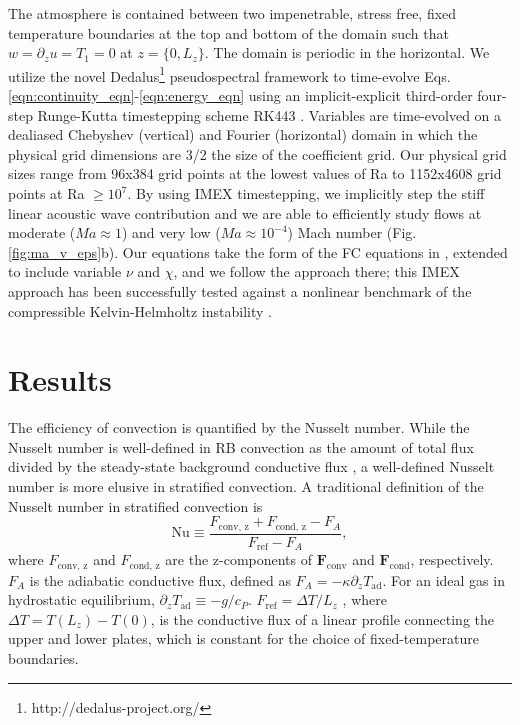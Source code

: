 \documentclass[aps, prl, twocolumn, nofootinbib, groupedaddress, amsfonts, amssymb, amsmath]{revtex4-1}
\begin{document}
The atmosphere is contained between two impenetrable, stress free, fixed temperature boundaries at
the top and bottom of the domain such that $w = \partial_z u = T_1 = 0$ at $z = \{0, L_z\}$. The domain
is periodic in the horizontal. We utilize the novel Dedalus\footnote{http://dedalus-project.org/} pseudospectral framework 
 to time-evolve Eqs. 
\ref{eqn:continuity_eqn}-\ref{eqn:energy_eqn} using an implicit-explicit third-order four-step 
Runge-Kutta timestepping scheme RK443 \cite{ascher&all1997}.  
Variables are time-evolved on a dealiased Chebyshev (vertical)
and Fourier (horizontal) domain in which the
physical grid dimensions are 3/2 the size of the coefficient grid.  Our physical grid sizes range from
96x384 grid points at the lowest values of Ra to 1152x4608 grid points at Ra $\geq 10^{7}$. 
By using IMEX timestepping, we implicitly step the stiff linear acoustic wave contribution and we are able to
efficiently study flows at moderate ($Ma \approx 1$) and very low ($Ma \approx 10^{-4}$)
Mach number (Fig. \ref{fig:ma_v_eps}b).  Our equations take the form
of the FC equations in \cite{lecoanet&all2014}, extended to include variable
$\nu$ and $\chi$, and we follow the approach there; this IMEX approach has been successfully 
tested against a nonlinear benchmark  of the compressible Kelvin-Helmholtz instability \cite{Lecoanet_et_al_2016_KH}.

\section{Results}
\label{sec:results}

The efficiency of convection is quantified by the Nusselt number.  
While the Nusselt number is well-defined in RB convection
as the amount of total flux divided by the steady-state background conductive flux 
\cite{johnston&doering2009, otero&all2002},
a well-defined Nusselt number is more elusive in stratified convection.  A traditional definition of the Nusselt
number in stratified convection is \cite{graham1975,hurlburt&all1984}
\begin{equation}
\text{Nu} \equiv \frac{F_{\text{conv, z}} + F_{\text{cond, z}} - F_A}{F_{\text{ref}} - F_A},
\label{eqn:nusselt}
\end{equation}
where $F_{\text{conv, z}}$ and $F_{\text{cond, z}}$ are the z-components of $\bm{F}_{\text{conv}}$ and $\bm{F}_{\text{cond}}$,
respectively.  $F_A$ is the adiabatic conductive flux, defined as $F_A = -\kappa \partial_z T_{\text{ad}}$.  For an
ideal gas in hydrostatic equilibrium, $\partial_z T_{\text{ad}} \equiv - g / c_{P}$.
$F_{\text{ref}} = \Delta T / L_z$ , where $\Delta T = T(L_z) - T(0)$, is the conductive flux of a linear profile connecting the upper
and lower plates, which is constant for the choice of fixed-temperature boundaries.
\end{document}
